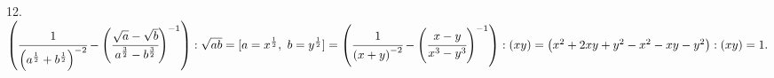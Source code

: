 12. $\left(\cfrac{1}{\left(a^\frac{1}{2}+b^\frac{1}{2}\right)^{-2}}-\left(\cfrac{\sqrt{a}-\sqrt{b}}{a^\frac{3}{2}-b^\frac{3}{2}}\right)^{-1}\right):\sqrt{ab}=
[a=x^{\frac{1}{2}},\ b=y^\frac{1}{2}]=\left(\cfrac{1}{\left(x+y\right)^{-2}}-\left(\cfrac{x-y}{x^3-y^3}\right)^{-1}\right):(xy)=
\left(x^2+2xy+y^2-x^2-xy-y^2\right):(xy)=1.$\\
